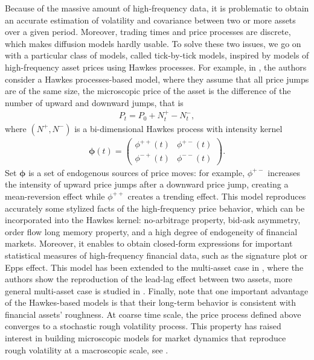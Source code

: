 \documentclass[12pt]{article}
\begin{document}
Because of the massive amount of high-frequency data, it is problematic to obtain an accurate estimation of volatility and covariance between two or more assets over a given period. Moreover, trading times and price processes are discrete, which makes diffusion models hardly usable. To solve these two issues,  we go on with a particular class of models, called tick-by-tick models, inspired by models of high-frequency asset prices using Hawkes processes. For example, in \cite{bacry2013modelling, bacry2014hawkes}, the authors consider a Hawkes processes-based model, where they assume that all price jumps are of the same size, the microscopic price of the asset is the difference of the number of upward and downward jumps, that is
\begin{align*}
    P_t = P_0 + N_t^+ - N_t^-, 
\end{align*}
where $(N^+,N^-)$ is a bi-dimensional Hawkes process with intensity kernel
\begin{align*}
    \boldsymbol{\phi}(t)  = 
    \begin{pmatrix}
     \phi^{++}(t) & \phi^{+-}(t) \\
     \phi^{-+}(t) & \phi^{--}(t)
    \end{pmatrix}.
\end{align*}
Set $\boldsymbol{\phi}$ is a set of endogenous sources of price moves: for example, $\phi^{+-}$ increases the intensity of upward price jumps after a downward price jump, creating a mean-reversion effect while $\phi^{++}$ creates a trending effect. This model reproduces accurately some stylized facts of the high-frequency price behavior, which can be incorporated into the Hawkes kernel: no-arbitrage property, bid-ask asymmetry, order flow long memory property, and a high degree of endogeneity of financial markets. Moreover, it enables to obtain closed-form expressions for important statistical measures of high-frequency financial data, such as the signature plot or Epps effect. This model has been extended to the multi-asset case in \cite{bacry2013some}, where the authors show the reproduction of the lead-lag effect between two assets, more general multi-asset case is studied in \cite{tomas2019microscopic}. Finally, note that one important advantage of the Hawkes-based models is that their long-term behavior is consistent with financial assets' roughness. At coarse time scale, the price process defined above converges to a stochastic rough volatility process. This property has raised interest in building microscopic models for market dynamics that reproduce rough volatility at a macroscopic scale, see \cite{jaisson2015limit, jaisson2016rough, jusselin2018no, tomas2019microscopic}. \medskip
\end{document}
